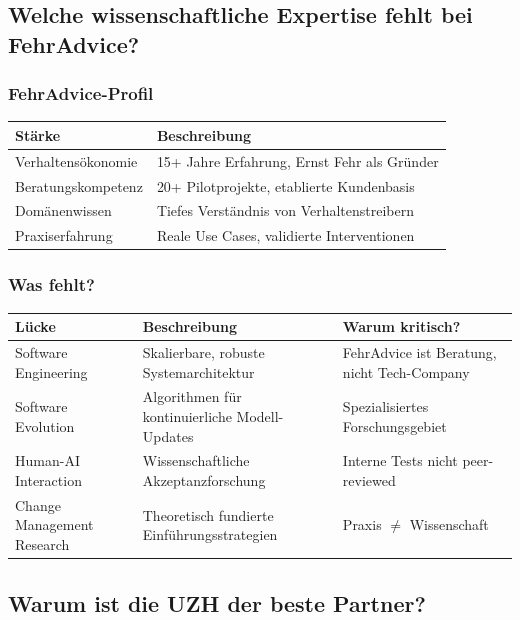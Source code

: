 \documentclass[11pt,a4paper]{article}
\begin{document}
\subsection{Welche wissenschaftliche Expertise fehlt bei FehrAdvice?}

\subsubsection{FehrAdvice-Profil}

\begin{table}[h]
\centering
\begin{tabularx}{\textwidth}{lX}
\toprule
\textbf{Stärke} & \textbf{Beschreibung} \\
\midrule
Verhaltensökonomie & 15+ Jahre Erfahrung, Ernst Fehr als Gründer \\
Beratungskompetenz & 20+ Pilotprojekte, etablierte Kundenbasis \\
Domänenwissen & Tiefes Verständnis von Verhaltenstreibern \\
Praxiserfahrung & Reale Use Cases, validierte Interventionen \\
\bottomrule
\end{tabularx}
\end{table}

\subsubsection{Was fehlt?}

\begin{table}[h]
\centering
\begin{tabularx}{\textwidth}{lXX}
\toprule
\textbf{Lücke} & \textbf{Beschreibung} & \textbf{Warum kritisch?} \\
\midrule
Software Engineering & Skalierbare, robuste Systemarchitektur & FehrAdvice ist Beratung, nicht Tech-Company \\
Software Evolution & Algorithmen für kontinuierliche Modell-Updates & Spezialisiertes Forschungsgebiet \\
Human-AI Interaction & Wissenschaftliche Akzeptanzforschung & Interne Tests nicht peer-reviewed \\
Change Management Research & Theoretisch fundierte Einführungsstrategien & Praxis $\neq$ Wissenschaft \\
\bottomrule
\end{tabularx}
\end{table}

\subsection{Warum ist die UZH der beste Partner?}
\end{document}
